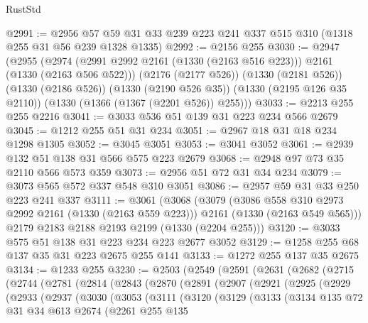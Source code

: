 \begin{lexlean}{RustStd}
\begin{coremodule}
@2991 := @2956 @57 @59 @31 @33 @239 @223 @241 @337 @515 @310 (@1318 @255 @31 @56 @239 @1328 @1335)
@2992 := @2156 @255
@3030 := @2947
    (@2955
      (@2974 (@2991 @2992 @2161 (@1330 (@2163 @516 @223))) @2161 (@1330 (@2163 @506 @522)))
      (@2176 (@2177 @526))
      (@1330 (@2181 @526))
      (@1330 (@2186 @526))
      (@1330 (@2190 @526 @35))
      (@1330 (@2195 @126 @35 @2110))
      (@1330 (@1366 (@1367 (@2201 @526)) @255)))
@3033 := @2213 @255 @255 @2216
@3041 := @3033 @536 @51 @139 @31 @223 @234 @566 @2679
@3045 := @1212 @255 @51 @31 @234
@3051 := @2967 @18 @31 @18 @234 @1298 @1305
@3052 := @3045 @3051
@3053 := @3041 @3052
@3061 := @2939 @132 @51 @138 @31 @566 @575 @223 @2679
@3068 := @2948 @97 @73 @35 @2110 @566 @573 @359
@3073 := @2956 @51 @72 @31 @34 @234
@3079 := @3073 @565 @572 @337 @548 @310 @3051
@3086 := @2957 @59 @31 @33 @250 @223 @241 @337
@3111 := @3061
    (@3068
      (@3079
        (@3086 @558 @310 @2973 @2992 @2161 (@1330 (@2163 @559 @223)))
        @2161
        (@1330 (@2163 @549 @565)))
      @2179
      @2183
      @2188
      @2193
      @2199
      (@1330 (@2204 @255)))
@3120 := @3033 @575 @51 @138 @31 @223 @234 @223 @2677 @3052
@3129 := @1258 @255 @68 @137 @35 @31 @223 @2675 @255 @141
@3133 := @1272 @255 @137 @35 @2675
@3134 := @1233 @255
@3230 := @2503
    (@2549
      (@2591
        (@2631
          (@2682
            (@2715
              (@2744
                (@2781
                  (@2814
                    (@2843
                      (@2870
                        (@2891
                          (@2907
                            (@2921
                              (@2925
                                (@2929
                                  (@2933
                                    (@2937
                                      (@3030
                                        (@3053
                                          (@3111
                                            (@3120
                                              (@3129
                                                (@3133
                                                  (@3134
                                                    @135
                                                    @72
                                                    @31
                                                    @34
                                                    @613
                                                    @2674
                                                    (@2261
                                                      @255
                                                      @135

\end{coremodule}
\end{lexlean}
